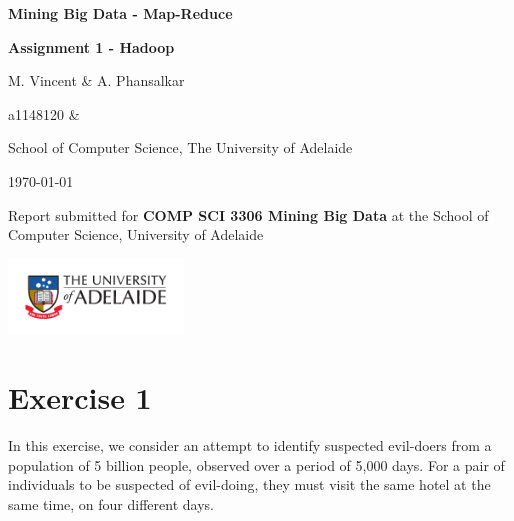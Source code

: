 \documentclass[12t]{article}
\begin{document}
 	\newcommand{\titlestr}{Mining Big Data - Map-Reduce}
 	\newcommand{\shorttitlestr}{Assignment 1 - Hadoop}
 	\newcommand{\groupnames}{M. Vincent \& A. Phansalkar}
 	\newcommand{\studentids}{a1148120 \& }
 	\newcommand{\authorstr}{\groupnames}
 	
 	\begin{titlepage}
 		\centering
 		
 		{\LARGE \bf \titlestr \par}
 		\vspace{0.25cm}
 		{\large \bf \shorttitlestr \par}
 		
 		
 		\vspace{1cm}
 		{\large \authorstr \\}
 		{ \studentids \par}
 		\vspace{0.25cm}
 		
 		\large School of Computer Science, The University of Adelaide
 		
 		\vspace{1cm}
 		\today
 		
 		\vspace{3cm}
 		Report submitted for
 		{\bf COMP SCI 3306 Mining Big Data}
 		at the School of Computer Science,
 		University of Adelaide
 		
 		\includegraphics[width=0.35\textwidth]{./Figures/UoA_logo_cmyk.pdf}
 		
 		\vspace{9cm}
 		

 	 	\vspace{1mm}
 		\noindent \hrulefill
 		
 		\vfill
 	\end{titlepage}
 	
 	\clearpage
 	\setcounter{page}{1}
	
	\section*{Exercise 1}
	
	In this exercise, we consider an attempt to identify suspected evil-doers from a population of 5 billion people, observed over a period of 5,000 days. For a pair of individuals to be suspected of evil-doing, they must visit the same hotel at the same time, on four different days. 
	
\end{document}
